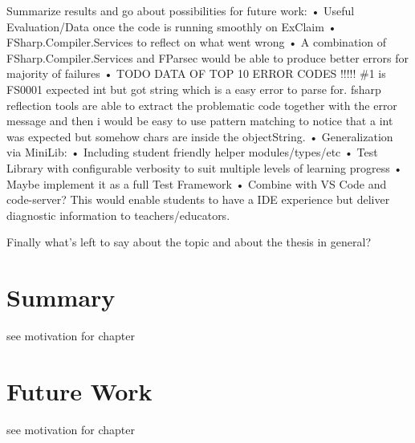 \documentclass[
	bibliography=totoc,
	listof=totoc,
]{scrbook}
\begin{document}
\begin{justify}
Summarize results and go about possibilities for future work:
• Useful Evaluation/Data once the code is running smoothly on ExClaim
• FSharp.Compiler.Services to reflect on what went wrong
• A combination of FSharp.Compiler.Services and FParsec would be able to produce better errors for majority of failures
• TODO DATA OF TOP 10 ERROR CODES !!!!! \#1 is FS0001 expected int but got string which is a easy error to parse for.
    fsharp reflection tools are able to extract the problematic code together with the error message and then i would be easy to use pattern matching to
    notice that a int was expected but somehow chars are inside the objectString.
• Generalization via MiniLib:
• Including student friendly helper modules/types/etc
• Test Library with configurable verbosity to suit multiple levels of learning progress
• Maybe implement it as a full Test Framework
• Combine with VS Code and code-server? This would enable students to have a IDE experience but deliver diagnostic information to teachers/educators.

Finally what's left to say about the topic and about the thesis in general?
\end{justify}


\section{Summary} %


\begin{marker}\begin{justify}
see motivation for chapter
\end{justify}\end{marker}



\section{Future Work} %


\begin{marker}\begin{justify}
see motivation for chapter
\end{justify}\end{marker}
\end{document}

